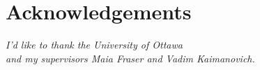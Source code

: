 \section*{Acknowledgements}
\vspace{5cm}
\begin{center}
  \begin{minipage}[c]{0.7\linewidth}
    \begin{center}
      \vspace{1cm}
      \textit{I'd like to thank the University of Ottawa \\
        and my supervisors Maia Fraser and Vadim Kaimanovich.}
    \end{center}
  \end{minipage}
\end{center}


